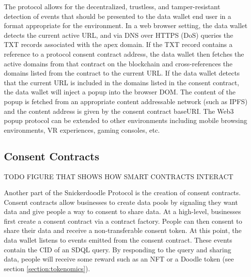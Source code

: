 The protocol allows for the decentralized, trustless, and tamper-resistant detection of events that should be presented to the data wallet 
end user in a format appropriate for the environment. In a web browser setting, the data wallet detects the current active URL, and via DNS 
over HTTPS (DoS) queries the TXT records associated with the apex domain. If the TXT record contains a reference to a protocol consent 
contract address, the data wallet then fetches the active domains from that contract on the blockchain and cross-references the domains 
listed from the contract to the current URL. If the data wallet detects that the current URL is included in the domains listed in the 
consent contract, the data wallet will inject a popup into the browser DOM. The content of the popup is fetched from an appropriate content 
addressable network (such as IPFS) and the content address is given by the consent contract baseURI. The Web3 popup protocol can be 
extended to other environments including mobile browsing environments, VR experiences, gaming consoles, etc. 

\subsection{Consent Contracts} %
\label{section:Contracts}
TODO FIGURE THAT SHOWS HOW SMART CONTRACTS INTERACT


Another part of the Snickerdoodle Protocol is the creation of consent contracts. Consent contracts allow businesses to create data pools by signaling they want data and give people a way to consent to share data. At a high-level, businesses first create a consent contract via a contract factory. People can then consent to share their data and receive a non-transferable consent token. At this point, the data wallet listens to events emitted from the consent contract. These events contain the CID of an SDQL query. By responding to the query and sharing data, people will receive some reward such as an NFT or a Doodle token (see section \ref{section:tokenomics}).

